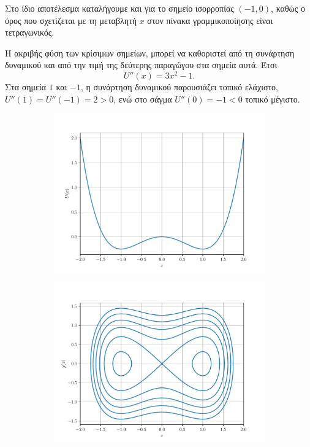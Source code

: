\begin{solution}
    Στο ίδιο αποτέλεσμα καταλήγουμε και για το σημείο ισορροπίας \( (-1,
    0) \), καθώς ο όρος που σχετίζεται με τη μεταβλητή \(x\) στον πίνακα
    γραμμικοποίησης είναι τετραγωνικός.

    Η ακριβής φύση των κρίσιμων σημείων, μπορεί να καθοριστεί από τη συνάρτηση δυναμικού
    και από την τιμή της δεύτερης παραγώγου στα σημεία αυτά. Έτσι
    \begin{equation*}
        U''(x) = 3x^2 - 1.
    \end{equation*}
    Στα σημεία \( 1 \) και \( -1 \), η συνάρτηση δυναμικού παρουσιάζει τοπικό
    ελάχιστο, \( U''(1) = U''(-1) = 2 > 0 \), ενώ στο σάγμα \( U''(0) = -1 < 0
    \) τοπικό μέγιστο.

    \begin{figure}[h!]
        \centering
        \begin{subfigure}[b]{0.8\textwidth}
            \includegraphics[width=\textwidth]{figures/ex2_undampedDuffingU.pdf}
        \end{subfigure}
        \begin{subfigure}[b]{0.8\textwidth}
            \includegraphics[width=\textwidth]{figures/ex2_undampedDuffingPor.pdf}

\end{subfigure}
\end{figure}
\end{solution}
